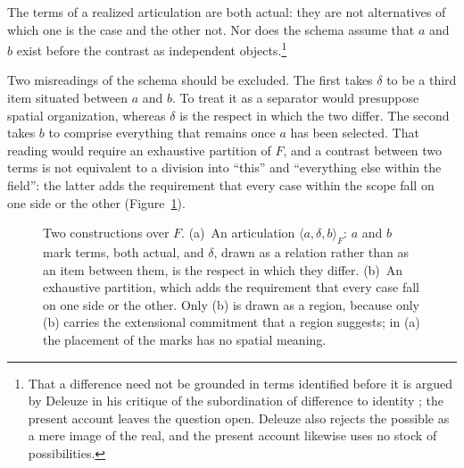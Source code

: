 \documentclass[11pt,a4paper,oneside]{scrartcl}
\newcommand{\F}{\ensuremath{F}}
\begin{document}
The terms of a realized articulation are both actual: they are not alternatives of which one is
the case and the other not. Nor does the schema assume that $a$ and $b$ exist before the contrast
as independent objects.\footnote{That a difference need not be grounded in terms identified before it is argued by
Deleuze in his critique of the subordination of difference to identity
\autocite[ch.~1]{deleuze1994}; the present account leaves the question open. Deleuze also rejects
the possible as a mere image of the real, and the present account likewise uses no stock of
possibilities.}

Two misreadings of the schema should be excluded. The first takes $\delta$ to be a third item
situated between $a$ and $b$. To treat it as a separator would presuppose spatial organization,
whereas $\delta$ is the respect in which the two differ. The second takes $b$ to comprise
everything that remains once $a$ has been selected. That reading would require an exhaustive partition of \F, and a
contrast between two terms is not equivalent to a division into \enquote{this} and
\enquote{everything else within the field}: the latter adds the requirement that every case within
the scope fall on one side or the other (Figure~\ref{fig:contrast}).

\begin{figure}[tp]
  \centering\small
  \caption{Two constructions over \F. (a)~An articulation $\langle a,\delta,b\rangle_F$: $a$ and $b$
    mark terms, both actual, and $\delta$, drawn as a relation rather than as an item between them,
    is the respect in which they differ. (b)~An exhaustive partition, which adds the requirement
    that every case fall on one side or the other. Only (b) is drawn as a region, because only (b)
    carries the extensional commitment that a region suggests; in (a) the placement of the marks
    has no spatial meaning.}
  \label{fig:contrast}
\end{figure}
\end{document}
